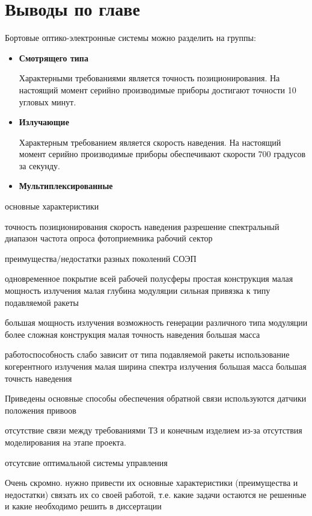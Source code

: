 \section{Выводы по главе} \label{sec:ch1/sec4-}

Бортовые оптико-электронные системы можно разделить на группы:
\begin{itemize}
	\item \textbf{Смотрящего типа}
	
	Характерными требованиями является точность позиционирования. На настоящий момент серийно производимые приборы достигают точности 10 угловых минут.
	
		
	\item \textbf{Излучающие}
	
	Характерным требованием является скорость наведения. На настоящий момент серийно производимые приборы обеспечивают скорости 700 градусов за секунду.
	\item \textbf{Мультиплексированные}
	
	
\end{itemize}

основные характеристики 

точность позиционирования
скорость наведения
разрешение 
спектральный диапазон
частота опроса фотоприемника
рабочий сектор

преимущества/недостатки разных поколений СОЭП

одновременное покрытие всей рабочей полусферы 
простая конструкция
малая мощность излучения
малая глубина модуляции
сильная привязка к типу подавляемой ракеты


большая мощность излучения
возможность генерации различного типа модуляции
более сложная конструкция
малая точность наведения
большая масса


работоспособность слабо зависит от типа подавляемой ракеты
использование когерентного излучения
малая ширина спектра излучения
большая масса
большая точнсть наведения


Приведены основные способы обеспечения обратной связи
используются датчики положения привоов

отсутствие связи между требованиями ТЗ и конечным изделием из-за отсутствия моделирования на этапе проекта.

отсутсвие оптимальной системы управления

Очень скромно. нужно привести их основные характеристики (преимущества и недостатки) связать их со своей работой, т.е. какие задачи остаются не решенные и какие необходимо решить в диссертации


















